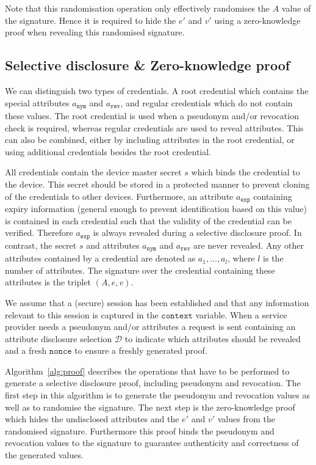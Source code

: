Note that this randomisation operation only effectively randomises the $A$ value of the signature.
Hence it is required to hide the $e'$ and $v'$ using a zero-knowledge proof when revealing this randomised signature.


\subsection{Selective disclosure \& Zero-knowledge proof}

We can distinguish two types of credentials. A root credential which contains the special attributes $a_\mathtt{nym}$ and $a_\mathtt{rev}$, and regular credentials which do not contain these values. The root credential is used when a pseudonym and/or revocation check is required, whereas regular credentials are used to reveal attributes. This can also be combined, either by including attributes in the root credential, or using additional credentials besides the root credential.

All credentials contain the device master secret $s$ which binds the credential to the device. This secret should be stored in a protected manner to prevent cloning of the credentials to other devices. Furthermore, an attribute $a_\mathtt{exp}$ containing expiry information (general enough to prevent identification based on this value) is contained in each credential such that the validity of the credential can be verified. Therefore $a_\mathtt{exp}$ is always revealed during a selective disclosure proof. In contrast, the secret $s$ and attributes $a_\mathtt{nym}$ and $a_\mathtt{rev}$ are never revealed. Any other attributes contained by a credential are denoted as $a_1, \dots, a_l$, where $l$ is the number of attributes. The signature over the credential containing these attributes is the triplet $(A, e, v)$.

We assume that a (secure) session has been established and that any information relevant to this session is captured in the $\mathtt{context}$ variable. When a service provider needs a pseudonym and/or attributes a request is sent containing an attribute disclosure selection $\mathcal{D}$ to indicate which attributes should be revealed and a fresh $\mathtt{nonce}$ to ensure a freshly generated proof.

Algorithm~\ref{alg:proof} describes the operations that have to be performed to generate a selective disclosure proof, including pseudonym and revocation. The first step in this algorithm is to generate the pseudonym and revocation values as well as to randomise the signature. The next step is the zero-knowledge proof which hides the undisclosed attributes and the $e'$ and $v'$ values from the randomised signature. Furthermore this proof binds the pseudonym and revocation values to the signature to guarantee authenticity and correctness of the generated values.

